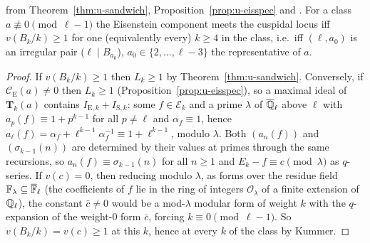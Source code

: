 \documentclass[11pt]{article}
\newcommand{\Tu}{\mathbf{T}}                      %
\newcommand{\Eis}{\mathrm{E}}
\newcommand{\cusp}{\mathrm{S}}
\newcommand{\Cg}{\mathcal{C}}                     %
\newcommand{\Ek}{\mathcal{E}}                     %
\newcommand{\Qlb}{\overline{\Q}_\ell}
\newcommand{\Ql}{\Q_\ell}
\begin{document}
\begin{corollary}\label{cor:u-irregular}
\PROVED{} from Theorem~\ref{thm:u-sandwich}, Proposition~\ref{prop:u-eisspec} and . For a class $a\not\equiv0\pmod{\ell-1}$ the Eisenstein component meets the cuspidal locus iff $v(B_k/k)\ge1$ for one (equivalently
every) $k\ge4$ in the class, i.e.\ iff $(\ell,a_0)$ is an irregular pair ($\ell\mid B_{a_0}$), $a_0\in\{2,\dots,\ell-3\}$ the representative of $a$.
\end{corollary}

\begin{proof}
If $v(B_k/k)\ge1$ then $L_k\ge1$ by Theorem~\ref{thm:u-sandwich}. Conversely, if $\Cg_\Eis(a)\ne0$ then $L_k\ge1$ (Proposition~\ref{prop:u-eisspec}), so a
maximal ideal of $\Tu_k(a)$ contains $I_{\Eis,k}+I_{\cusp,k}$: some $f\in\Ek_k$ and a prime $\lambda$ of $\Qlb$ above $\ell$ with $a_p(f)\equiv1+p^{k-1}$ for
all $p\ne\ell$ and $\alpha_f\equiv1$, hence $a_\ell(f)=\alpha_f+\ell^{k-1}\alpha_f^{-1}\equiv1+\ell^{k-1}$, modulo $\lambda$. Both $(a_n(f))$ and
$(\sigma_{k-1}(n))$ are determined by their values at primes through the same recursions, so $a_n(f)\equiv\sigma_{k-1}(n)$ for all $n\ge1$ and
$E_k-f\equiv c\pmod\lambda$ as $q$-series. If $v(c)=0$, then reducing modulo $\lambda$, as forms over the residue field $\mathbb{F}_\lambda\subseteq\overline{\mathbb{F}}_\ell$ (the coefficients of
$f$ lie in the ring of integers $\mathcal O_\lambda$ of a finite extension of $\Ql$), the constant $\bar c\ne0$ would be a mod-$\lambda$ modular form of weight
$k$ with the $q$-expansion of the weight-$0$ form $\bar c$, forcing $k\equiv0\pmod{\ell-1}$. So $v(B_k/k)=v(c)\ge1$ at this $k$, hence at every $k$ of the class by Kummer.
\end{proof}
\end{document}
